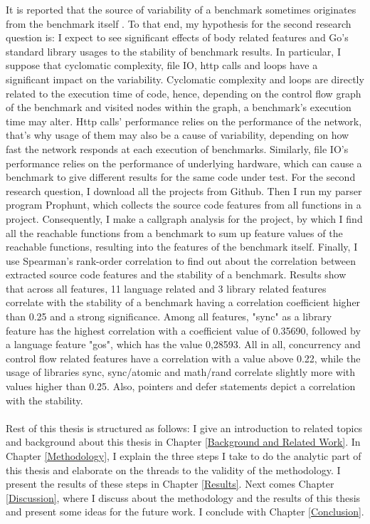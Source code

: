 \documentclass{seal_thesis}
\begin{document}
\noindent It is reported that the source of variability of a benchmark sometimes originates from the benchmark itself \cite{laaber2019software}. To that end, my hypothesis for the second research question is: I expect to see significant effects of body related features and Go's standard library usages to the stability of benchmark results. In particular, I suppose that cyclomatic complexity, file IO, http calls and loops have a significant impact on the variability. Cyclomatic complexity and loops are directly related to the execution time of code, hence, depending on the control flow graph of the benchmark and visited nodes within the graph, a benchmark's execution time may alter. Http calls' performance relies on the performance of the network, that's why usage of them may also be a cause of variability, depending on how fast the network responds at each execution of benchmarks. Similarly, file IO's performance relies on the performance of underlying hardware, which can cause a benchmark to give different results for the same code under test. For the second research question, I download all the projects from Github. Then I run my parser program Prophunt, which collects the source code features from all functions in a project. Consequently, I make a callgraph analysis for the project, by which I find all the reachable functions from a benchmark to sum up feature values of the reachable functions, resulting into the features of the benchmark itself. Finally, I use Spearman's rank-order correlation to find out about the correlation between extracted source code features and the stability of a benchmark. Results show that across all features, 11 language related and 3 library related features correlate with the stability of a benchmark having a correlation coefficient higher than 0.25 and a strong significance. Among all features, "sync" as a library feature has the highest correlation with a coefficient value of 0.35690, followed by a language feature "gos", which has the value 0,28593. All in all, concurrency and control flow related features have a correlation with a value above 0.22, while the usage of libraries sync, sync/atomic and math/rand correlate slightly more with values higher than 0.25. Also, pointers and defer statements depict a correlation with the stability.\\
\\
Rest of this thesis is structured as follows: I give an introduction to related topics and background about this thesis in Chapter \ref{Background and Related Work}. In Chapter \ref{Methodology}, I explain the three steps I take to do the analytic part of this thesis and elaborate on the threads to the validity of the methodology. I present the results of these steps in Chapter \ref{Results}. Next comes Chapter \ref{Discussion}, where I discuss about the methodology and the results of this thesis and present some ideas for the future work. I conclude with Chapter \ref{Conclusion}.
\end{document}
